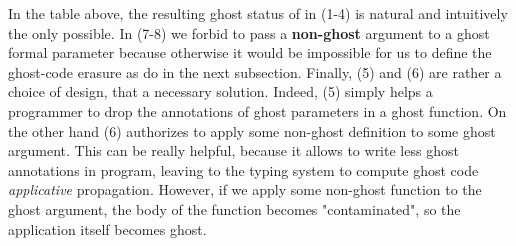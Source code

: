 \documentclass[a4paper,11pt,oneside]{article}
\theoremstyle{plain}
\begin{document}
In the table above, the resulting ghost status of in (1-4) is natural and intuitively the only possible.
In (7-8) we forbid to pass a \textbf{non-ghost} argument to a ghost formal parameter because otherwise it would be impossible for us to define the ghost-code erasure as do in the next subsection. 
Finally, (5) and (6) are rather a choice of design, that a necessary solution.
Indeed,  (5) simply helps a programmer to drop the annotations of ghost parameters in a ghost function. On the other hand (6) authorizes to apply some non-ghost definition  
to some ghost argument. This can be really helpful, because it allows to write less ghost annotations in program, leaving to the typing system to compute ghost code \textit{applicative} propagation. However, if we apply some non-ghost function to the ghost argument, the body of the function becomes "contaminated", so the application itself becomes ghost.
\end{document}
